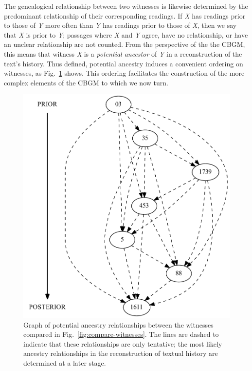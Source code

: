 \documentclass[a4paper, 12pt]{article}
\begin{document}
	\newpage
	
	The genealogical relationship between two witnesses is likewise determined by the predominant relationship of their corresponding readings. If \emph{X} has readings prior to those of \emph{Y} more often than \emph{Y} has readings prior to those of \emph{X}, then we say that \emph{X} is prior to \emph{Y}; passages where \emph{X} and \emph{Y} agree, have no relationship, or have an unclear relationship are not counted. From the perspective of the the CBGM, this means that witness \emph{X} is a \emph{potential ancestor} of \emph{Y} in a reconstruction of the text's history. Thus defined, potential ancestry induces a convenient ordering on witnesses, as Fig.~\ref{fig:potential-ancestors} shows. This ordering facilitates the construction of the more complex elements of the CBGM to which we now turn.
	
	\begin{figure}[h!]
		\centering
		\includegraphics[scale=0.6666]{../graphics/potential-ancestors.pdf}
		\caption{Graph of potential ancestry relationships between the witnesses compared in Fig.~\ref{fig:compare-witnesses}. The lines are dashed to indicate that these relationships are only tentative; the most likely ancestry relationships in the reconstruction of textual history are determined at a later stage.}
		\label{fig:potential-ancestors}
	\end{figure}
	
\end{document}

